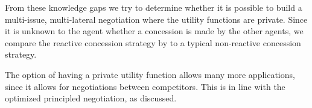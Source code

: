 From these knowledge gaps we try to determine whether it is possible to build a multi-issue, multi-lateral negotiation where the utility functions are private. Since it is unknown to the agent whether a concession is made by the other agents, we compare the reactive concession strategy by \citet{zheng2015automated} to a typical non-reactive concession strategy.

The option of having a private utility function allows many more applications, since it allows for negotiations between competitors. This is in line with the optimized principled negotiation, as discussed.